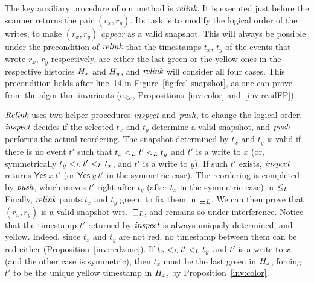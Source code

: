 The key auxiliary procedure of our method is $\textit{relink}$. It is
executed just before the scanner returns the pair $(r_x, r_y)$. Its
task is to modify the logical order of the writes, to make $(r_x,
r_y)$ \emph{appear} as a valid snapshot. This will always be possible
under the precondition of $\textit{relink}$ that the timestamps $t_x$,
$t_y$ of the events that wrote $r_x$, $r_y$ respectively, are either
the last green or the yellow ones in the respective histories $H_x$
and $H_y$, and $\textit{relink}$ will consider all four cases. This
precondition holds after line~14 in Figure~\ref{fig:fcsl-snapshot}, as
one can prove from the algorithm invariants (e.g.,
Propositions~\ref{inv:color} and~\ref{inv:readFP}).
%

%

$\textit{Relink}$ uses two helper procedures $\textit{inspect}$ and
$\textit{push}$, to change the logical order. $\textit{inspect}$ decides if
the selected $t_x$ and $t_y$ determine a valid snapshot, and
$\textit{push}$ performs the actual reordering. The snapshot determined
by $t_x$ and $t_y$ is valid if there is no event $t'$ such that
$t_x \mathrel{<_L} t' \mathrel{<_L} t_y$ and $t'$ is a write to $x$ (or, symmetrically
$t_y \mathrel{<_L} t' \mathrel{<_L} t_x$, and $t'$ is a write to $y$). If such $t'$
exists, $\textit{inspect}$ returns $\mathsf{Yes}\ x\ t'$ (or
$\mathsf{Yes}\ y\ t'$ in the symmetric case). The reordering is
completed by $\textit{push}$, which moves $t'$ right after $t_y$ (after
$t_x$ in the symmetric case) in $\mathrel{\leq_L}$. Finally, $\textit{relink}$
paints $t_x$ and $t_y$ green, to fix them in $\mathrel{\sqsubseteq_L}$. We can then
prove that $(r_x, r_y)$ is a valid snapshot wrt.~$\mathrel{\sqsubseteq_L}$, and remains
so under interference. 
%
Notice that the timestamp $t'$ returned by $\textit{inspect}$ is always
uniquely determined, and yellow. Indeed, since $t_x$ and $t_y$ are not
red, no timestamp between them can be red either
(Proposition~\ref{inv:redzone}). If $t_x \mathrel{<_L} t' \mathrel{<_L} t_y$ and $t'$ is
a write to $x$ (and the other case is symmetric), then $t_x$ must be
the last green in $H_x$, forcing $t'$ to be the unique yellow
timestamp in $H_x$, by Proposition~\ref{inv:color}.

